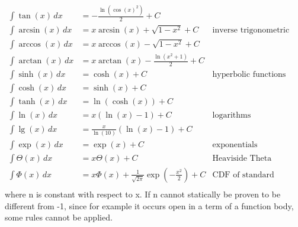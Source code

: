 \documentclass[oneside, a4paper]{article}
\begin{document}
\begin{align*}
    \int \tan(x) \,dx               & = -\frac{\ln\left(\cos(x)^2\right)}{2}           + C         & \text{}                                    \\
    \int \arcsin(x) \,dx            & = x \arcsin(x) + \sqrt{1 - x^2}                  + C         & \text{inverse trigonometric functions}     \\
    \int \arccos(x) \,dx            & = x \arccos(x) - \sqrt{1 - x^2}                  + C         & \text{}                                    \\
    \int \arctan(x) \,dx            & = x \arctan(x) - \frac{\ln\left(x^2+1\right)}{2} + C         & \text{}                                    \\
    \int \sinh(x) \,dx              & = \cosh(x)                                       + C         & \text{hyperbolic functions}                \\
    \int \cosh(x) \,dx              & = \sinh(x)                                       + C         & \text{}                                    \\
    \int \tanh(x) \,dx              & = \ln\left(\cosh(x)\right)                       + C         & \text{}                                    \\
    \int \ln(x) \,dx                & = x \left(\ln(x) - 1\right)                      + C         & \text{logarithms}                          \\
    \int \lg(x) \,dx                & = \frac{x}{\ln(10)} \left(\ln(x) - 1\right)      + C         & \text{}                                    \\
    \int \exp(x) \,dx               & = \exp(x)                                        + C         & \text{exponentials}                        \\
    \int \Theta(x) \,dx             & = x \Theta(x)                                    + C         & \text{Heaviside Theta}                     \\
    \int \Phi(x) \,dx               & = x \Phi(x) + \frac{1}{\sqrt{2\pi}} \exp(-\frac{x^2}{2}) + C & \text{CDF of standard normal distribution} \\
\end{align*}
where n is constant with respect to x. If n cannot statically be proven to be different from -1, since for example it occurs open in a term of a function body, some rules cannot be applied.
\end{document}
